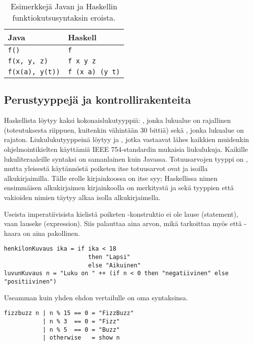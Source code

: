 \begin{table}
    \begin{tabular}[H]{l|l}
        Java                    &   Haskell         \\
        \hline
        \texttt{f()}            &   \texttt{f}              \\
        \texttt{f(x, y, z)}     &   \texttt{f x y z}        \\
        \texttt{f(x(a), y(t))}  &   \texttt{f (x a) (y t)}  \\
    \end{tabular}
    \label{tbl:function-call-examples}
    \caption{Esimerkkejä Javan ja Haskellin funktiokutsusyntaksin eroista.}
\end{table}

\subsection{Perustyyppejä ja kontrollirakenteita}
Haskellista löytyy kaksi kokonaislukutyyppiä: ,
jonka lukualue on rajallinen (toteutuksesta riippuen, kuitenkin vähintään 30 bittiä)
sekä ,
jonka lukualue on rajaton.
Liukulukutyyppeinä löytyy  ja ,
jotka vastaavat lähes kaikkien muidenkin ohjelmointikielten käyttämiä IEEE 754-standardin mukaisia liukulukuja.
Kaikille lukuliteraaleille syntaksi on samanlainen kuin Javassa.
Totuusarvojen tyyppi on ,
mutta yleisestä käytännöstä poiketen itse totuusarvot ovat  ja  isoilla alkukirjaimilla.
Tälle erolle kirjainkoossa on itse syy; Haskellissa nimen ensimmäisen alkukirjaimen kirjainkoolla on merkitystä
ja sekä tyyppien että vakioiden nimien täytyy alkaa isolla alkukirjaimella.

Useista imperatiivisista kielistä poiketen -konstruktio ei ole lause (statement),
vaan lauseke (expression).
Siis  palauttaa aina arvon, mikä tarkoittaa myös että -haara on aina pakollinen.

\begin{verbatim}
henkilonKuvaus ika = if ika < 18
                        then "Lapsi"
                        else "Aikuinen"
luvunKuvaus n = "Luku on " ++ (if n < 0 then "negatiivinen" else "positiivinen")
\end{verbatim}

Useamman kuin yhden ehdon vertailulle on oma syntaksinsa.

\begin{verbatim}
fizzbuzz n | n % 15 == 0 = "FizzBuzz"
           | n % 3  == 0 = "Fizz"
           | n % 5  == 0 = "Buzz"
           | otherwise   = show n
\end{verbatim}

